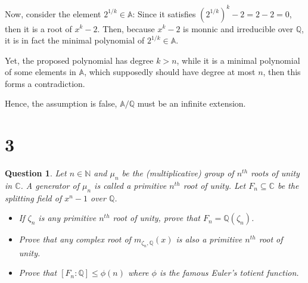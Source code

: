 \documentclass{article}
\newtheorem{question}{Question}
\begin{document}
Now, consider the element $2^{1/k}\in\mathbb{A}$: Since it satisfies $(2^{1/k})^k-2 = 2-2=0$, then it is a root of $x^k-2$.
Then, because $x^k-2$ is monnic and irreducible over $\mathbb{Q}$, it is in fact the minimal polynomial of $2^{1/k}\in\mathbb{A}$.

Yet, the proposed polynomial has degree $k>n$, while it is a minimal polynomial of some elements in $\mathbb{A}$, which supposedly should have degree at most $n$,
then this forms a contradiction.

Hence, the assumption is false, $\mathbb{A}/\mathbb{Q}$ must be an infinite extension.

\break

\section*{3}
\begin{myBox}[]{}
    \begin{question}
        Let $n\in\mathbb{N}$ and $\mu_n$ be the (multiplicative) group of $n^{th}$ roots of unity in $\mathbb{C}$.
        A generator of $\mu_n$ is called a primitive $n^{th}$ root of unity. Let $F_n\subseteq\mathbb{C}$ be the splitting field  of $x^n-1$ over $\mathbb{Q}$.
        \begin{itemize}
            \item[(a)] If $\zeta_n$ is any primitive $n^{th}$ root of unity, prove that $F_n=\mathbb{Q}(\zeta_n)$.
            \item[(b)] Prove that any complex root of $m_{\zeta_n,\mathbb{Q}}(x)$ is also a primitive $n^{th}$ root of unity.
            \item[(c)] Prove that $[F_n:\mathbb{Q}]\leq \phi(n)$ where $\phi$ is the famous Euler's totient function.
        \end{itemize}
    \end{question}
\end{myBox}
\end{document}
